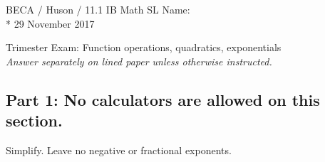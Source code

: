 \documentclass[]{book}
\begin{document}
\noindent BECA / Huson / 11.1 IB Math SL \hspace{2in} Name:\\*
29 November 2017
\begin{center}
{\Large Trimester Exam: Function operations, quadratics, exponentials}\\
\textit{Answer separately on lined paper unless otherwise instructed.}
\end{center}

\subsection*{Part 1: No calculators are allowed on this section.}


Simplify. Leave no negative or fractional exponents.
\end{document}
